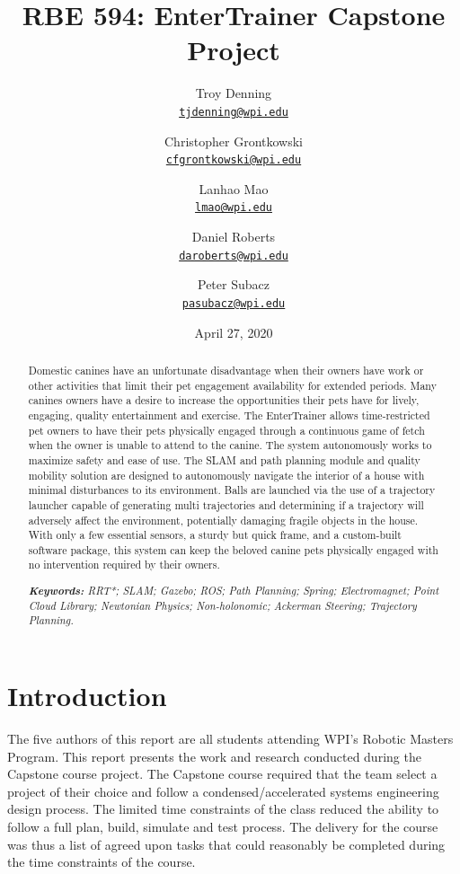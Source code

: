\documentclass[11pt]{article}
\title{RBE 594: EnterTrainer Capstone Project
}
\author{Troy Denning\\%
    \href{mailto:tjdenning@wpi.edu}{\texttt{tjdenning@wpi.edu}} %
\and Christopher Grontkowski\\%
    \href{mailto:cfgrontkowski@wpi.edu}{\texttt{cfgrontkowski@wpi.edu}} %
\and Lanhao Mao\\%
    \href{mailto:firstauthor@wpi.edu}{\texttt{lmao@wpi.edu}} %
\and Daniel Roberts\\%
    \href{mailto:firstauthor@wpi.edu}{\texttt{daroberts@wpi.edu}} %
\and Peter Subacz\\%
    \href{mailto:pasubacz@wpi.edu}{\texttt{pasubacz@wpi.edu}} %
    }
\date{April 27, 2020}
\begin{document}
{
\maketitle
\begin{abstract}
Domestic canines have an unfortunate disadvantage when their owners have work or other activities that limit their pet engagement availability for extended periods. Many canines owners have a desire to increase the opportunities their pets have for lively, engaging, quality entertainment and exercise. The EnterTrainer allows time-restricted pet owners to have their pets physically engaged through a continuous game of fetch when the owner is unable to attend to the canine. The system autonomously works to maximize safety and ease of use. The SLAM and path planning module and quality mobility solution are designed to autonomously navigate the interior of a house with minimal disturbances to its environment. Balls are launched via the use of a trajectory launcher capable of generating multi trajectories and determining if a trajectory will adversely affect the environment, potentially damaging fragile objects in the house. With only a few essential sensors, a sturdy but quick frame, and a custom-built software package, this system can keep the beloved canine pets physically engaged with no intervention required by their owners.

\noindent
\textit{\textbf{Keywords: }%
RRT*; SLAM; Gazebo; ROS; Path Planning; Spring; Electromagnet; Point Cloud Library; Newtonian Physics; Non-holonomic; Ackerman Steering; Trajectory Planning.} \\ %

\end{abstract}
}

\section{Introduction}

The five authors of this report are all students attending WPI's Robotic Masters Program. This report presents the work and research conducted during the Capstone course project. The Capstone course required that the team select a project of their choice and follow a condensed/accelerated systems engineering design process. The limited time constraints of the class reduced the ability to follow a full plan, build, simulate and test process. The delivery for the course was thus a list of agreed upon tasks that could reasonably be completed during the time constraints of the course.
\end{document}
